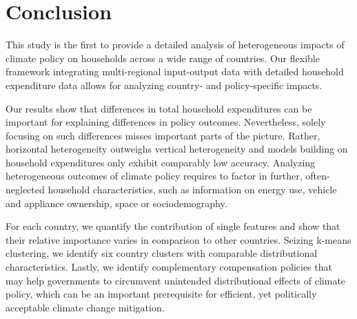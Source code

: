 \documentclass[12pt, a4paper]{article}
\begin{document}
\section{Conclusion} \label{sec:conclusion}

This study is the first to provide a detailed analysis of heterogeneous impacts of climate policy on households across a wide range of countries. Our flexible framework integrating multi-regional input-output data with detailed household expenditure data allows for analyzing country- and policy-specific impacts.

Our results show that differences in total household expenditures can be important for explaining differences in policy outcomes. Nevertheless, solely focusing on such differences misses important parts of the picture. Rather, horizontal heterogeneity outweighs vertical heterogeneity and models building on household expenditures only exhibit comparably low accuracy. Analyzing heterogeneous outcomes of climate policy requires to factor in further, often-neglected household characteristics, such as information on energy use, vehicle and appliance ownership, space or sociodemography.

For each country, we quantify the contribution of single features and show that their relative importance varies in comparison to other countries. Seizing k-means clustering, we identify six country clusters with comparable distributional characteristics. %
Lastly, we identify complementary compensation policies that may help governments to circumvent unintended distributional effects of climate policy, which can be an important prerequisite for efficient, yet politically acceptable climate change mitigation. 

\clearpage

\begin{refcontext}[sorting=nyt]
\printbibliography
\end{refcontext}

\clearpage
\end{document}
